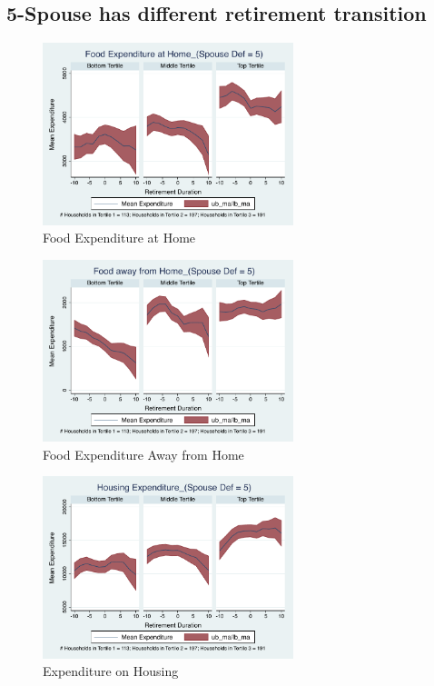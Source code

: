 \documentclass[11pt,onecolumn]{article}
\numberwithin{figure}{section}
\begin{document}
\clearpage

\subsection{5-Spouse has different retirement transition}

\begin{figure}[h]
	\caption{Food Expenditure at Home}
	\centering
	\includegraphics[width=0.65\textwidth]{../ConsumptionPostRetirement_by_SpouseDef_Cats/Smoothed/5/spouse_def_total_foodexp_home_real.pdf}
\end{figure}


\begin{figure}[h]
	\caption{Food Expenditure Away from Home}
	\centering
	\includegraphics[width=0.65\textwidth]{../ConsumptionPostRetirement_by_SpouseDef_Cats/Smoothed/5/spouse_def_total_foodexp_away_real.pdf}
\end{figure}

\clearpage

\begin{figure}[h]
	\caption{Expenditure on Housing}
	\centering
	\includegraphics[width=0.65\textwidth]{../ConsumptionPostRetirement_by_SpouseDef_Cats/Smoothed/5/spouse_def_total_housing_real.pdf}
\end{figure}
\end{document}
